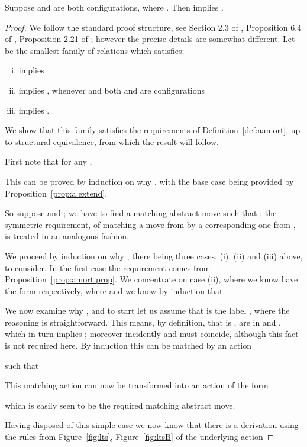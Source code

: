 \documentclass{LMCS}
\begin{document}
\begin{thm}[-contextual]\label{thm:compositionProof}
  Suppose  and 
  are both configurations, where .  Then  implies .
\end{thm}
\begin{proof}
  We follow the standard proof structure, see Section 2.3 of
  \cite{pibook}, Proposition 6.4 of \cite{pityping}, Proposition 2.21
  of \cite{dpibook};  however the precise details are somewhat
  different.  Let  be the smallest family
  of relations which satisfies:
\begin{enumerate}[(i)]
\item 
 implies
 

\item 
 implies 
, whenever  and 
both   and 
  are  configurations

\item 
 implies 
.
\end{enumerate}
We show that this family satisfies the requirements of Definition~\ref{def:aamort}, up to structural
equivalence, from which
the result will follow.

First note that for any , 

This can be proved by induction on
why , with the base case being
provided by Proposition~\ref{prop:a.extend}.  

So suppose  and ; we have to find a matching abstract  move  such that ; the symmetric requirement, of matching a move from  by a corresponding one from , is treated in
an analogous fashion.

We proceed by induction on why ,
there being three cases, (i), (ii) and (iii) above, to consider.  In the first case
the requirement comes from 
Proposition~\ref{prop:amort.prop}. We concentrate on case (ii), where
we know 
  have the form  respectively,
where  
and we know by induction that 

We now examine why , and to start let us assume that  is the label
, where the reasoning is straightforward. 
This means, by definition, that   is ,  are in  and 
, which in 
turn implies ;
moreover incidently  and  must coincide, although this fact is not required here. 
By induction this can
be matched by an action 

such that 

This matching action can now be transformed into an action of the 
form 

which is easily seen to be the required matching abstract  move.  

Having disposed of this simple case we now know that 
there is a  derivation using the rules from
Figure~\ref{fig:lts}, Figure~\ref{fig:ltsB} of the underlying action


\end{proof}
\end{document}
